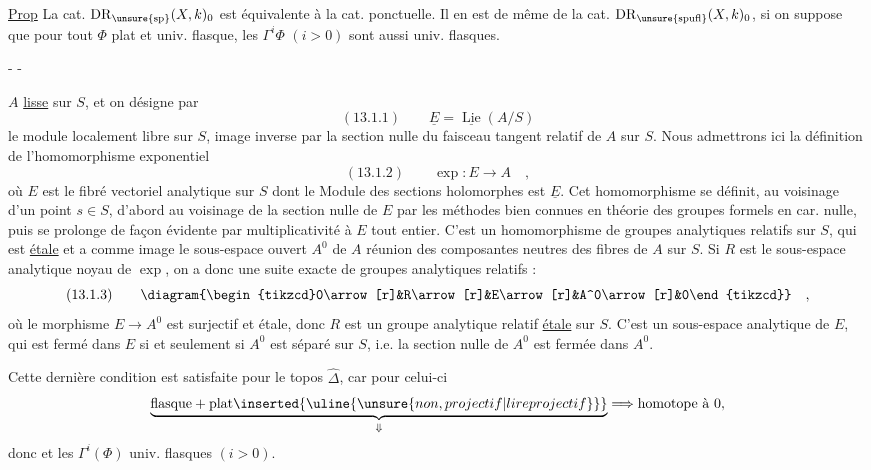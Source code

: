 \uline{Prop} La cat. $\mathrm{DR}_{\unsure{\mathrm{sp}}}(X,k)_0$ est équivalente à la cat. ponctuelle. Il en est de même de la cat. $\mathrm{DR}_{\unsure{\mathrm{spufl}}}(X,k)_0$, si on suppose que pour tout  $\Phi$ plat et univ. flasque, les $\Gamma^i\Phi$ $(i>0)$ sont aussi univ. flasques.


\begin{center}-  -\end{center}
$A$ \uline{lisse} sur $S$, et on désigne par
\[
(13.1.1)\qquad\underline E=\underline{\operatorname{Lie}}(A/S)
\]
le module localement libre sur $S$, image inverse par la section nulle du faisceau tangent relatif de $A$ sur $S$. Nous admettrons ici la définition de l'homomorphisme exponentiel
\[
(13.1.2)\qquad\exp:E\longrightarrow A\quad,
\]
où $E$ est le fibré vectoriel analytique sur $S$ dont le Module des sections holomorphes est $\underline E$. Cet homomorphisme se définit, au voisinage d'un point $s\in S$, d'abord au voisinage de la section nulle de $E$ par les méthodes bien connues en théorie des groupes formels en car. nulle, puis se prolonge de façon évidente par multiplicativité à $E$ tout entier. C'est un homomorphisme de groupes analytiques relatifs sur $S$, qui est \uline{étale} et a comme image le sous-espace ouvert $A^0$ de $A$ réunion des composantes neutres des fibres de $A$ sur $S$. Si $R$ est le sous-espace analytique noyau de $\exp$, on a donc une suite exacte de groupes analytiques relatifs :
\[
(13.1.3)\qquad
\diagram{\begin{tikzcd}0\arrow[r]&R\arrow[r]&E\arrow[r]&A^0\arrow[r]&0\end{tikzcd}}\quad,
\]
où le morphisme $E\longrightarrow A^0$ est surjectif et étale, donc $R$ est un groupe analytique relatif \uline{étale} sur $S$. C'est un sous-espace analytique de $E$, qui est fermé dans $E$ si et seulement si $A^0$ est séparé sur $S$, i.e. la section nulle de $A^0$ est fermée dans $A^0$.


Cette dernière condition est satisfaite pour le topos  $\widehat\Delta$, car pour celui-ci
\[
\underbrace{\text{flasque}+\text{plat}\inserted{\uline{\unsure{non, projectif|lire projectif}}}}_{\Downarrow}\Longrightarrow\text{homotope à }0,
\]
donc  et les $\Gamma^i(\Phi)$ univ. flasques $(i>0)$.

